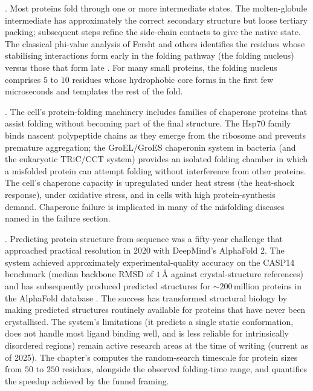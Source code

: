 . Most proteins fold
through one or more intermediate states. The molten-globule
intermediate has approximately the correct secondary structure but
loose tertiary packing; subsequent steps refine the side-chain
contacts to give the native state. The classical phi-value analysis
of Fersht and others identifies the residues whose stabilising
interactions form early in the folding pathway (the folding nucleus)
versus those that form late \cite{paper:v6c04-fersht-phi-1995}. For
many small proteins, the folding nucleus comprises $5$ to $10$
residues whose hydrophobic core forms in the first few microseconds
and templates the rest of the fold.

. The cell's protein-folding machinery includes
families of chaperone proteins that assist folding without becoming
part of the final structure. The Hsp70 family binds nascent
polypeptide chains as they emerge from the ribosome and prevents
premature aggregation; the GroEL/GroES chaperonin system in bacteria
(and the eukaryotic TRiC/CCT system) provides an isolated folding
chamber in which a misfolded protein can attempt folding without
interference from other proteins. The cell's chaperone capacity is
upregulated under heat stress (the heat-shock response), under
oxidative stress, and in cells with high protein-synthesis demand.
Chaperone failure is implicated in many of the misfolding diseases
named in the failure section.

. Predicting protein
structure from sequence was a fifty-year challenge that approached
practical resolution in 2020 with DeepMind's AlphaFold 2. The system
achieved approximately experimental-quality accuracy on the CASP14
benchmark (median backbone RMSD of $1\,\si{\angstrom}$ against
crystal-structure references) and has subsequently produced
predicted structures for $\sim 200\,$million proteins in the AlphaFold
database \cite{paper:jumper-alphafold2-2021,paper:v6c04-jumper-alphafold-2021}.
The success has transformed structural biology by making predicted
structures routinely available for proteins that have never been
crystallised. The system's limitations (it predicts a single static
conformation, does not handle most ligand binding well, and is less
reliable for intrinsically disordered regions) remain active research
areas at the time of writing (current as of 2025). The chapter's
 computes the random-search timescale
for protein sizes from $50$ to $250$ residues, alongside the observed
folding-time range, and quantifies the speedup achieved by the funnel
framing.

